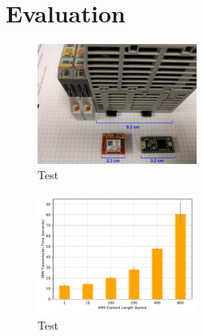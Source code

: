 \section{Evaluation}
\label{sec:evaluation}

\begin{figure}[th]
	\includegraphics[width=0.47\textwidth]{figures/eval_size}
	\centering
	\caption{Test}
	\label{fig:eval_size}
\end{figure}

\begin{figure}[th]
	\includegraphics[width=0.47\textwidth]{figures/smstime}
	\centering
	\caption{Test}
	\label{fig:smstime}
\end{figure}


